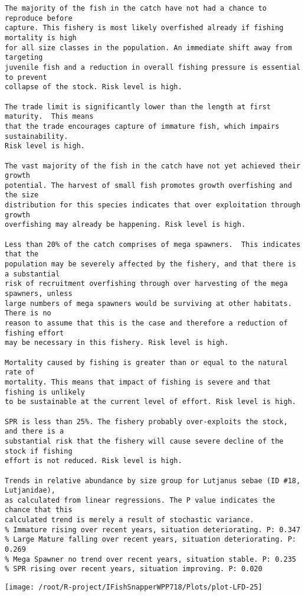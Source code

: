 \documentclass{report}\usepackage[]{graphicx}\usepackage[]{color}
\makeatletter
\def\maxwidth{ %
  \ifdim\Gin@nat@width>\linewidth
    \linewidth
  \else
    \Gin@nat@width
  \fi
}
\newenvironment{kframe}{%
 \def\at@end@of@kframe{}%
 \ifinner\ifhmode%
  \def\at@end@of@kframe{\end{minipage}}%
  \begin{minipage}{\columnwidth}%
 \fi\fi%
 \def\FrameCommand##1{\hskip\@totalleftmargin \hskip-\fboxsep
 \colorbox{shadecolor}{##1}\hskip-\fboxsep
     \hskip-\linewidth \hskip-\@totalleftmargin \hskip\columnwidth}%
 \MakeFramed {\advance\hsize-\width
   \@totalleftmargin\z@ \linewidth\hsize
   \@setminipage}}%
 {\par\unskip\endMakeFramed%
 \at@end@of@kframe}
\newenvironment{knitrout}{}{} %
\makeatother
\begin{document}
\begin{knitrout}
\begin{kframe}
\begin{verbatim}
The majority of the fish in the catch have not had a chance to reproduce before
capture. This fishery is most likely overfished already if fishing mortality is high
for all size classes in the population. An immediate shift away from targeting
juvenile fish and a reduction in overall fishing pressure is essential to prevent
collapse of the stock. Risk level is high.

The trade limit is significantly lower than the length at first maturity.  This means
that the trade encourages capture of immature fish, which impairs sustainability.
Risk level is high.

The vast majority of the fish in the catch have not yet achieved their growth
potential. The harvest of small fish promotes growth overfishing and the size
distribution for this species indicates that over exploitation through growth
overfishing may already be happening. Risk level is high.

Less than 20% of the catch comprises of mega spawners.  This indicates that the
population may be severely affected by the fishery, and that there is a substantial
risk of recruitment overfishing through over harvesting of the mega spawners, unless
large numbers of mega spawners would be surviving at other habitats. There is no
reason to assume that this is the case and therefore a reduction of fishing effort
may be necessary in this fishery. Risk level is high.
 
Mortality caused by fishing is greater than or equal to the natural rate of
mortality. This means that impact of fishing is severe and that fishing is unlikely
to be sustainable at the current level of effort. Risk level is high.
 
SPR is less than 25%. The fishery probably over-exploits the stock, and there is a
substantial risk that the fishery will cause severe decline of the stock if fishing
effort is not reduced. Risk level is high.
 
Trends in relative abundance by size group for Lutjanus sebae (ID #18, Lutjanidae),
as calculated from linear regressions. The P value indicates the chance that this
calculated trend is merely a result of stochastic variance.
% Immature rising over recent years, situation deteriorating. P: 0.347
% Large Mature falling over recent years, situation deteriorating. P: 0.269
% Mega Spawner no trend over recent years, situation stable. P: 0.235
% SPR rising over recent years, situation improving. P: 0.020
\end{verbatim}
\end{kframe}
\texttt{[image: /root/R-project/IFishSnapperWPP718/Plots/plot-LFD-25]} 


\end{knitrout}
\end{document}
